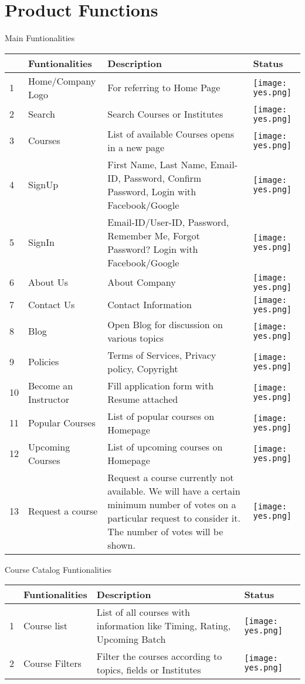 \section{Product Functions}
Main Funtionalities
\begin{center}
 \begin{tabular}{|p{0.4cm}|p{4cm}|p{9cm}|p{1.3cm}|} 
 \hline
  & \textbf{Funtionalities} & \textbf{Description} & \textbf{Status} \\ [0.5ex] 
 \hline
 1 & Home/Company Logo & For referring to Home Page & \texttt{[image: yes.png]} \\ 
 \hline
 2 & Search & Search Courses or Institutes & \texttt{[image: yes.png]} \\
 \hline
 3 & Courses & List of available Courses opens in a new page & \texttt{[image: yes.png]} \\
 \hline
 4 & SignUp & First Name, Last Name, Email-ID, Password, Confirm Password, Login with Facebook/Google & \texttt{[image: yes.png]} \\
 \hline
 5 & SignIn & Email-ID/User-ID, Password, Remember Me, Forgot Password? Login with Facebook/Google & \texttt{[image: yes.png]} \\
 \hline
 6 & About Us & About Company & \texttt{[image: yes.png]} \\
 \hline
 7 & Contact Us & Contact Information & \texttt{[image: yes.png]} \\
 \hline
 8 & Blog & Open Blog for discussion on various topics & \texttt{[image: yes.png]} \\
 \hline
 9 & Policies & Terms of Services, Privacy policy, Copyright & \texttt{[image: yes.png]} \\
 \hline
 10 & Become an Instructor & Fill application form with Resume attached & \texttt{[image: yes.png]} \\
 \hline
 11 & Popular Courses & List of popular courses on Homepage & \texttt{[image: yes.png]} \\
 \hline
 12 & Upcoming Courses & List of upcoming courses on Homepage & \texttt{[image: yes.png]} \\
 \hline
 13 & Request a course & Request a course currently not available. We will have a certain minimum number of votes on a particular request to consider it. The number of votes will be shown. & \texttt{[image: yes.png]} \\
 \hline
 \end{tabular}
\end{center}


Course Catalog Funtionalities
\begin{center}
 \begin{tabular}{|p{0.4cm}|p{4cm}|p{9cm}|p{1.3cm}|} 
 \hline
  & \textbf{Funtionalities} & \textbf{Description} & \textbf{Status} \\ [0.5ex] 
 \hline
 1 & Course list & List of all courses with information like Timing, Rating, Upcoming Batch & \texttt{[image: yes.png]} \\ 
 \hline
 2 & Course Filters & Filter the courses according to topics, fields or Institutes & \texttt{[image: yes.png]} \\
 \hline
 \end{tabular}
\end{center}


